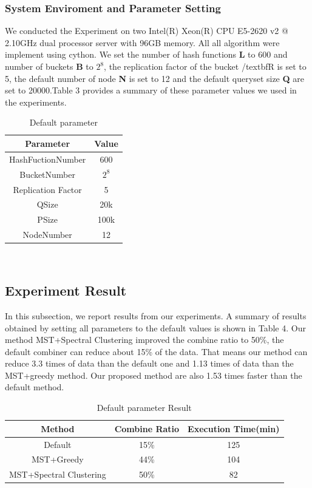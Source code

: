 \documentclass{vldb}
\begin{document}
\subsubsection{System Enviroment and Parameter Setting}
We conducted the Experiment on two Intel(R) Xeon(R) CPU E5-2620 v2 @ 2.10GHz dual processor server with 96GB memory. All all algorithm were implement using cython.
We set the number of hash functions \textbf{L} to 600 and number of buckets \textbf{B} to $2^{8}$, the replication factor of the bucket /textbf{R} is set to 5, the default number of node \textbf{N} is set to 12 and the default queryset size \textbf{Q} are set to 20000.Table 3 provides a summary of these parameter values we used in the experiments.
\begin{table} [h]
\centering
\caption{Default parameter}
\label{tab:table}
\begin{tabular}{|c|c|} \hline
Parameter & Value\\\hline
HashFuctionNumber & 600 \\\hline
BucketNumber & $2^{8}$\\\hline
Replication Factor & 5\\\hline
QSize & 20k\\\hline
PSize & 100k\\\hline
NodeNumber & 12\\\hline
\end{tabular}\\
\end{table}

\subsection{Experiment Result}
In this subsection, we report results from our experiments. A summary of results obtained by setting all parameters to the default values is shown in Table 4. Our method MST+Spectral Clustering improved the combine ratio to 50\%, the default combiner can reduce about 15\% of the data. That means our method can reduce 3.3 times of data than the default one and  1.13 times of data than the MST+greedy method. Our proposed method are also 1.53 times faster than the default method.

\begin{table} [h]
\centering
\caption{Default parameter Result}
\label{tab:table}
\begin{tabular}{|c|c|c|} \hline
Method & Combine Ratio & Execution Time(min)\\\hline
Default &15\% & 125  \\\hline
MST+Greedy & 44\% & 104 \\\hline
MST+Spectral Clustering & 50\% & 82 \\\hline
\end{tabular}\\
\end{table}
\end{document}
